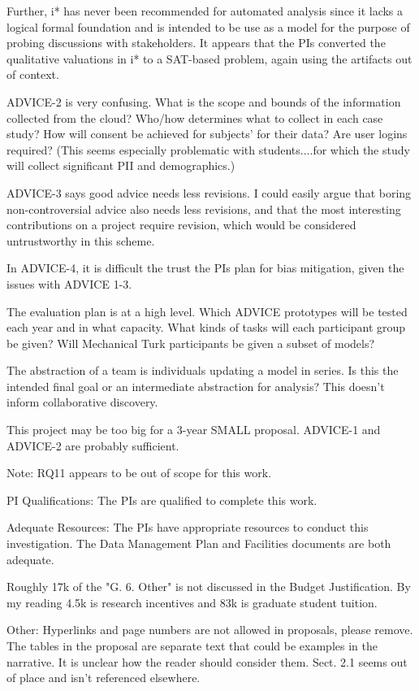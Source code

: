 Further, i* has never been recommended for automated analysis since it lacks a logical formal foundation and is intended to be use as a model for the purpose of probing discussions with stakeholders. It appears that the PIs converted the qualitative valuations in i* to a SAT-based problem, again using the artifacts out of context.

ADVICE-2 is very confusing. What is the scope and bounds of the information collected from the cloud? Who/how determines what to collect in each case study? How will consent be achieved for subjects' for their data? Are user logins required? (This seems especially problematic with students....for which the study will collect significant PII and demographics.)

ADVICE-3 says good advice needs less revisions. I could easily argue that boring non-controversial advice also needs less revisions, and that the most interesting contributions on a project require revision, which would be considered untrustworthy in this scheme.

In ADVICE-4, it is difficult the trust the PIs plan for bias mitigation, given the issues with ADVICE 1-3.

The evaluation plan is at a high level. Which ADVICE prototypes will be tested each year and in what capacity. What kinds of tasks will each participant group be given? Will Mechanical Turk participants be given a subset of models?

The abstraction of a team is individuals updating a model in series. Is this the intended final goal or an intermediate abstraction for analysis? This doesn't inform collaborative discovery.

This project may be too big for a 3-year SMALL proposal. ADVICE-1 and ADVICE-2 are probably sufficient.

Note: RQ11 appears to be out of scope for this work.

PI Qualifications:
The PIs are qualified to complete this work.

Adequate Resources:
The PIs have appropriate resources to conduct this investigation. The Data Management Plan and Facilities documents are both adequate.

Roughly 17k of the "G. 6. Other" is not discussed in the Budget Justification. By my reading 4.5k is research incentives and 83k is graduate student tuition.

Other:
Hyperlinks and page numbers are not allowed in proposals, please remove.
The tables in the proposal are separate text that could be examples in the narrative. It is unclear how the reader should consider them.
Sect. 2.1 seems out of place and isn't referenced elsewhere.

